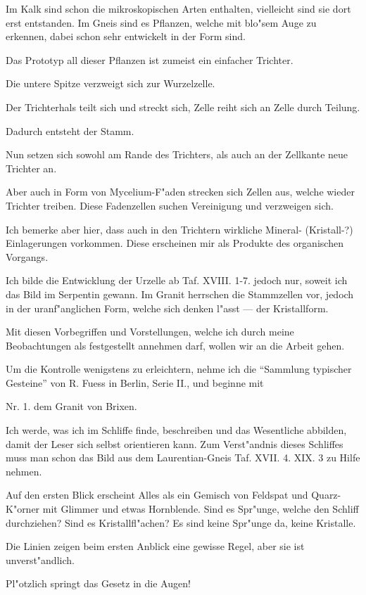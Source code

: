 \documentclass[a4paper, 11pt, oneside, german]{article}
\begin{document}
Im Kalk sind schon die mikroskopischen Arten enthalten, vielleicht sind sie dort erst entstanden. Im Gneis sind es Pflanzen, welche mit blo"sem Auge zu erkennen, dabei schon sehr entwickelt in der Form sind.

Das Prototyp all dieser Pflanzen ist zumeist ein einfacher Trichter.

Die untere Spitze verzweigt sich zur Wurzelzelle.

Der Trichterhals teilt sich und streckt sich, Zelle reiht sich an Zelle durch Teilung.

Dadurch entsteht der Stamm.

Nun setzen sich sowohl am Rande des Trichters, als auch an der Zellkante neue Trichter an.

Aber auch in Form von Mycelium-F"aden strecken sich Zellen aus, welche wieder Trichter treiben. Diese Fadenzellen suchen Vereinigung und verzweigen sich.

Ich bemerke aber hier, dass auch in den Trichtern wirkliche Mineral- (Kristall-?) Einlagerungen vorkommen. Diese erscheinen mir als Produkte des organischen Vorgangs.

Ich bilde die Entwicklung der Urzelle ab Taf. XVIII. 1-7. jedoch nur, soweit ich das Bild im Serpentin gewann. Im Granit herrschen die Stammzellen vor, jedoch in der uranf"anglichen Form, welche sich denken l"asst --- der Kristallform.

Mit diesen Vorbegriffen und Vorstellungen, welche ich durch meine Beobachtungen als festgestellt annehmen darf, wollen wir an die Arbeit gehen.

Um die Kontrolle wenigstens zu erleichtern, nehme ich die "`Sammlung typischer Gesteine"' von R. Fuess in Berlin, Serie II., und beginne mit

Nr. 1. dem Granit von Brixen.

Ich werde, was ich im Schliffe finde, beschreiben und das Wesentliche abbilden, damit der Leser sich selbst orientieren kann. Zum Verst"andnis dieses Schliffes muss man schon das Bild aus dem Laurentian-Gneis Taf. XVII. 4. XIX. 3 zu Hilfe nehmen.

Auf den ersten Blick erscheint Alles als ein Gemisch von Feldspat und Quarz-K"orner mit Glimmer und etwas Hornblende. Sind es Spr"unge, welche den Schliff durchziehen? Sind es Kristallfl"achen? Es sind keine Spr"unge da, keine Kristalle.

Die Linien zeigen beim ersten Anblick eine gewisse Regel, aber sie ist unverst"andlich.

Pl"otzlich springt das Gesetz in die Augen!
\end{document}
